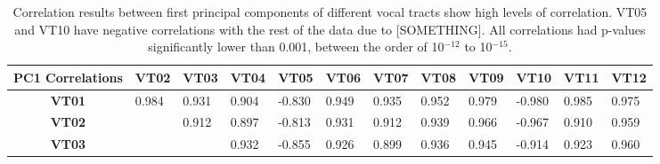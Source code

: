 \documentclass{article}
\begin{document}
\begin{table}[]
\centering
\caption{Correlation results between first principal components of different vocal tracts show high levels of correlation. VT05 and VT10 have negative correlations with the rest of the data due to [SOMETHING]. All correlations had p-values significantly lower than 0.001, between the order of 10$^{-12}$ to 10$^{-15}$.}
\label{my-label}
\begin{tabular}{|c|l|l|l|l|l|l|l|l|l|l|l|}
\hline
\textbf{PC1 Correlations} & \multicolumn{1}{c|}{\textbf{VT02}} & \multicolumn{1}{c|}{\textbf{VT03}} & \multicolumn{1}{c|}{\textbf{VT04}}              & \multicolumn{1}{c|}{\textbf{VT05}}              & \multicolumn{1}{c|}{\textbf{VT06}}              & \multicolumn{1}{c|}{\textbf{VT07}}              & \multicolumn{1}{c|}{\textbf{VT08}} & \multicolumn{1}{c|}{\textbf{VT09}} & \multicolumn{1}{c|}{\textbf{VT10}} & \multicolumn{1}{c|}{\textbf{VT11}} & \multicolumn{1}{c|}{\textbf{VT12}} \\ \hline
\textbf{VT01}         & 0.984                              & 0.931                              & 0.904                                           & -0.830                                          & 0.949                                           & 0.935                                           & 0.952                              & 0.979                              & -0.980                             & 0.985                              & 0.975                              \\ \hline
\textbf{VT02}         & \cellcolor[HTML]{C0C0C0}           & 0.912                              & 0.897                                           & -0.813                                          & 0.931                                           & 0.912                                           & 0.939                              & 0.966                              & -0.967                             & 0.910                              & 0.959                              \\ \hline
\textbf{VT03}         & \cellcolor[HTML]{C0C0C0}           & \cellcolor[HTML]{C0C0C0}           & 0.932                                           & -0.855                                          & 0.926                                           & 0.899                                           & 0.936                              & 0.945                              & -0.914                             & 0.923                              & 0.960                              \\ \hline

\end{tabular}
\end{table}
\end{document}
